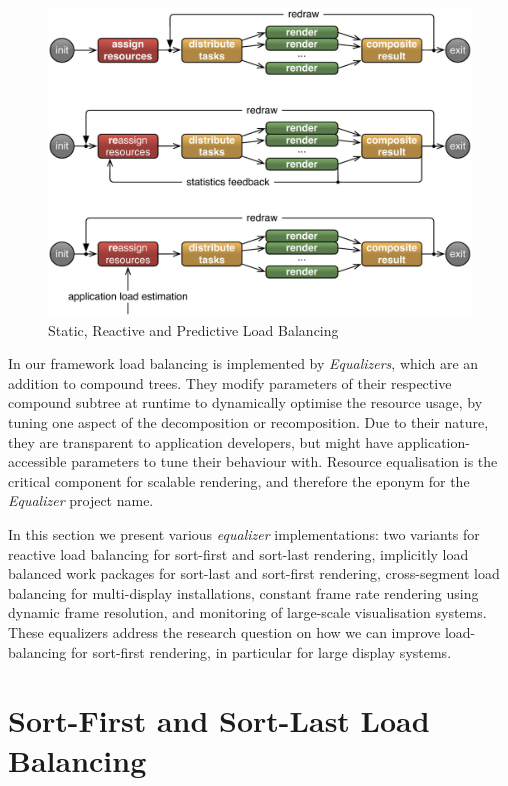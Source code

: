 \begin{figure}[h!t]
  \includegraphics[width=\textwidth]{images/loadBalancing}
  \caption{\label{floadbalancing}Static, Reactive and Predictive Load Balancing}
\end{figure}

In our framework load balancing is implemented by {\em Equalizers}, which are
an addition to compound trees. They modify parameters of their respective
compound subtree at runtime to dynamically optimise the resource usage, by
tuning one aspect of the decomposition or recomposition. Due to their nature,
they are transparent to application developers, but might have
application-accessible parameters to tune their behaviour with. Resource
equalisation is the critical component for scalable rendering, and therefore
the eponym for the {\em Equalizer} project name.

In this section we present various {\em equalizer} implementations: two
variants for reactive load balancing for sort-first and sort-last rendering,
implicitly load balanced work packages for sort-last and sort-first rendering,
cross-segment load balancing for multi-display installations, constant frame
rate rendering using dynamic frame resolution, and monitoring of large-scale
visualisation systems. These equalizers address the research question on how we
can improve load-balancing for sort-first rendering, in particular for large
display systems.

\section{Sort-First and Sort-Last Load Balancing}\label{sLoadEqualizer}

